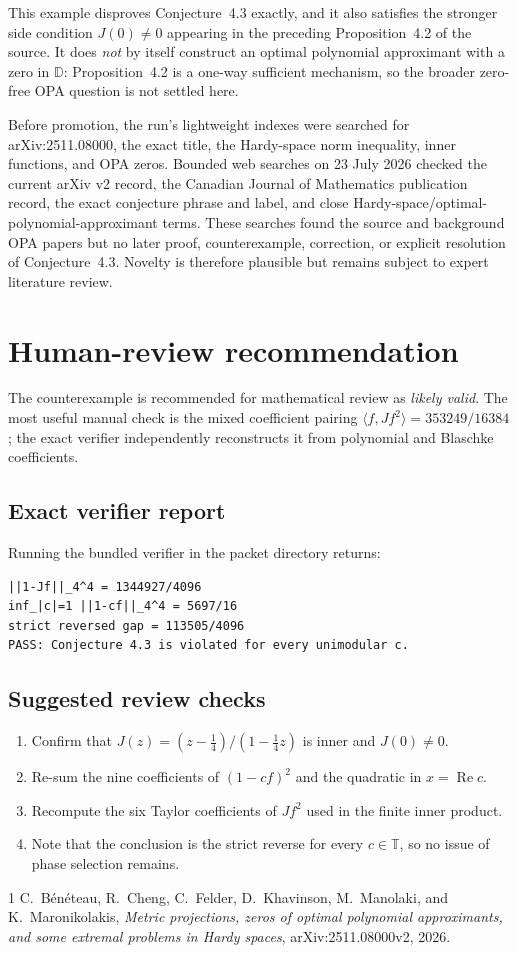 \documentclass[11pt]{article}
\newcommand{\D}{\mathbb D}
\newcommand{\T}{\mathbb T}
\begin{document}
This example disproves Conjecture~4.3 exactly, and it also satisfies the
stronger side condition \(J(0)\ne0\) appearing in the preceding
Proposition~4.2 of the source.  It does \emph{not} by itself construct an
optimal polynomial approximant with a zero in \(\D\): Proposition~4.2 is a
one-way sufficient mechanism, so the broader zero-free OPA question is not
settled here.

Before promotion, the run's lightweight indexes were searched for
arXiv:2511.08000, the exact title, the Hardy-space norm inequality, inner
functions, and OPA zeros.  Bounded web searches on 23 July 2026 checked the
current arXiv v2 record, the Canadian Journal of Mathematics publication
record, the exact conjecture phrase and label, and close
Hardy-space/optimal-polynomial-approximant terms.  These searches found the
source and background OPA papers but no later proof, counterexample,
correction, or explicit resolution of Conjecture~4.3.  Novelty is therefore
plausible but remains subject to expert literature review.

\section{Human-review recommendation}

The counterexample is recommended for mathematical review as \emph{likely
valid}.  The most useful manual check is the mixed coefficient pairing
\(\langle f,Jf^2\rangle=353249/16384\); the exact verifier independently
reconstructs it from polynomial and Blaschke coefficients.

\subsection*{Exact verifier report}

Running the bundled verifier in the packet directory returns:
\begin{verbatim}
||1-Jf||_4^4 = 1344927/4096
inf_|c|=1 ||1-cf||_4^4 = 5697/16
strict reversed gap = 113505/4096
PASS: Conjecture 4.3 is violated for every unimodular c.
\end{verbatim}

\subsection*{Suggested review checks}

\begin{enumerate}
\item Confirm that \(J(z)=(z-\frac14)/(1-\frac14z)\) is inner and
      \(J(0)\ne0\).
\item Re-sum the nine coefficients of \((1-cf)^2\) and the quadratic
      in \(x=\operatorname{Re}c\).
\item Recompute the six Taylor coefficients of \(Jf^2\) used in the
      finite inner product.
\item Note that the conclusion is the strict reverse for every \(c\in\T\),
      so no issue of phase selection remains.
\end{enumerate}

\begin{thebibliography}{1}
C.~B\'en\'eteau, R.~Cheng, C.~Felder, D.~Khavinson, M.~Manolaki, and
K.~Maronikolakis,
\emph{Metric projections, zeros of optimal polynomial approximants, and
some extremal problems in Hardy spaces},
arXiv:2511.08000v2, 2026.
\end{thebibliography}
\end{document}
